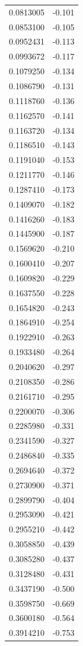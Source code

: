 \documentclass[number, sort&compress, review, 12pt]{elsarticle}
\begin{document}
\begin{longtable}{rr}
0.0813005 & -0.101\\
0.0853100 & -0.105\\
0.0952431 & -0.113\\
0.0993672 & -0.117\\
0.1079250 & -0.134\\
0.1086790 & -0.131\\
0.1118760 & -0.136\\
0.1162570 & -0.141\\
0.1163720 & -0.134\\
0.1186510 & -0.143\\
0.1191040 & -0.153\\
0.1211770 & -0.146\\
0.1287410 & -0.173\\
0.1409070 & -0.182\\
0.1416260 & -0.183\\
0.1445900 & -0.187\\
0.1569620 & -0.210\\
0.1600410 & -0.207\\
0.1609820 & -0.229\\
0.1637550 & -0.228\\
0.1654820 & -0.243\\
0.1864910 & -0.254\\
0.1922910 & -0.263\\
0.1933480 & -0.264\\
0.2040620 & -0.297\\
0.2108350 & -0.286\\
0.2161710 & -0.295\\
0.2200070 & -0.306\\
0.2285980 & -0.331\\
0.2341590 & -0.327\\
0.2486840 & -0.335\\
0.2694640 & -0.372\\
0.2730900 & -0.371\\
0.2899790 & -0.404\\
0.2953090 & -0.421\\
0.2955210 & -0.442\\
0.3058850 & -0.439\\
0.3085280 & -0.437\\
0.3128480 & -0.431\\
0.3437190 & -0.500\\
0.3598750 & -0.669\\
0.3600180 & -0.564\\
0.3914210 & -0.753\\

\end{longtable}
\end{document}

